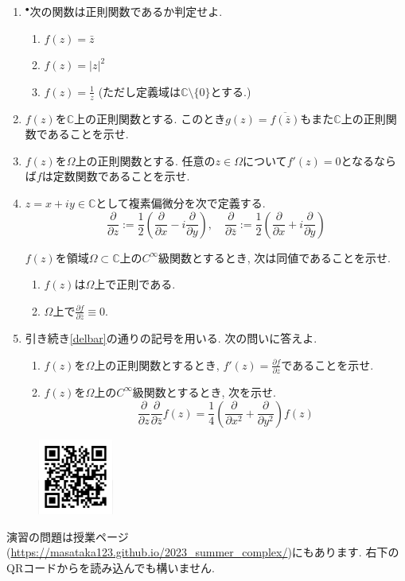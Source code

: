 \documentclass[dvipdfmx,a4paper,11pt]{article}
\newcommand{\C}{\mathbb{C}}
\theoremstyle{definition}
\newcommand{\pdrv}[2]{\frac{\partial #1}{\partial #2}}
\begin{document}
\begin{enumerate}[label=\textbf{問}1.\arabic*]
  
 \item $^{\bullet}$次の関数は正則関数であるか判定せよ.
 \begin{enumerate}
\setlength{\parskip}{0cm} 
  \setlength{\itemsep}{0cm} 
  \item $f(z) = \bar{z}$
   \item $f(z) = |z|^2$
    \item $f(z) = \frac{1}{z}$ (ただし定義域は$\C \setminus \{ 0\}$とする.)
 \end{enumerate}
 
 \item $f(z)$を$\C$上の正則関数とする. このとき$g(z) = \overline{f(\bar{z})}$もまた$\C$上の正則関数であることを示せ. 

\item $f(z)$を$\Omega$上の正則関数とする. 任意の$z \in \Omega$について$f'(z)=0$となるならば$f$は定数関数であることを示せ.



\item \label{delbar}$z = x + iy \in \C$として複素偏微分を次で定義する.
$$
\pdrv{}{z} := \frac{1}{2} \left(\pdrv{}{x}  - i \pdrv{}{y} \right), \quad
\pdrv{}{\bar{z}} := \frac{1}{2} \left(\pdrv{}{x}  + i \pdrv{}{y}\right)
$$

$f(z)$を領域$\Omega  \subset \C$上の$C^{\infty}$級関数とするとき, 次は同値であることを示せ.
\begin{enumerate}
    \setlength{\parskip}{0cm} 
  \setlength{\itemsep}{0cm} 
  \item $f(z)$は$\Omega$上で正則である.
  \item $\Omega$上で$\pdrv{f}{\bar{z}}  \equiv 0$.
\end{enumerate}

\item 引き続き\ref{delbar}の通りの記号を用いる. 次の問いに答えよ. 
 \begin{enumerate}
\setlength{\parskip}{0cm} 
  \setlength{\itemsep}{0cm} 
\item  $f(z)$を$\Omega$上の正則関数とするとき, $f'(z)=\pdrv{f}{z}$であることを示せ.
\item $f(z)$を$\Omega$上の$C^{\infty}$級関数とするとき, 次を示せ.
$$\pdrv{}{z}\pdrv{}{\bar{z}} f(z) = \frac{1}{4}\left(\pdrv{}{x^2} + \pdrv{}{y^2} \right) f(z)$$
 \end{enumerate}
 

 \end{enumerate}

 
 \vspace{11pt}\begin{figure}  \centering\includegraphics[height=25mm, width=25mm]{complex.png}\end{figure}

演習の問題は授業ページ(\url{https://masataka123.github.io/2023_summer_complex/})にもあります. 右下のQRコードからを読み込んでも構いません.


  
  
 
\end{document}

